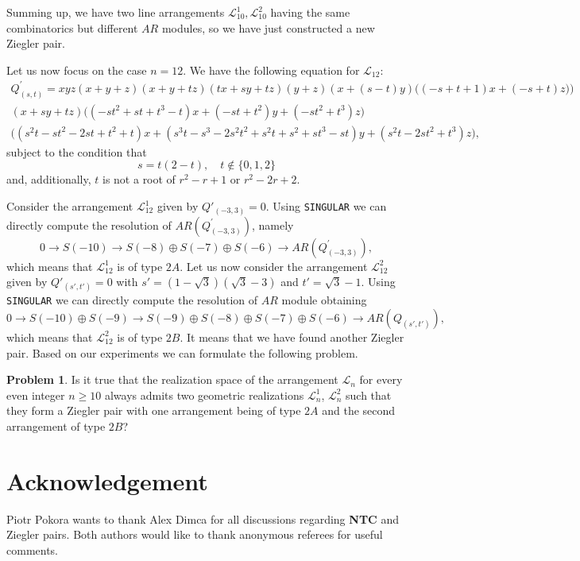 \documentclass[12pt]{article}
\theoremstyle{plain}
\theoremstyle{definition}
\newtheorem{problem}[thm]{Problem}
\renewcommand\geq{\geqslant}
\begin{document}
Summing up, we have two line arrangements $\mathcal{L}_{10}^{1}, \mathcal{L}_{10}^{2}$ having the same combinatorics but different $AR$ modules, so we have just constructed a new Ziegler pair.


Let us now focus on the case $n=12$. We have the following equation for $\mathcal{L}_{12}$:
\begin{multline*}
Q^{'}_{(s,t)} =  xyz(x+y+z)(x+y+tz)(tx+sy+tz)(y+z)(x + (s-t)y)\bigg((-s+t+1)x + (-s+t)z)\bigg) \\
(x+sy+tz)\bigg((-s t^2 + st + t^3 - t)x+(-st + t^2)y+(-st^2 + t^3)z\bigg) \\
\bigg((s^2 t - st^2 - 2st + t^2 + t)x+(s^3t - s^3 - 2s^2 t^2 + s^2 t + s^2 + s t^3 - st)y + (s^2 t - 2st^2 + t^3)z\bigg),
\end{multline*}
subject to the condition that $$ s = t(2-t), \quad t \notin \{ 0,1,2 \} $$
and, additionally, $t$ is not a root of $r^2-r+1$ or $r^2-2r+2$.

Consider the arrangement $\mathcal{L}_{12}^{1}$ given by $Q'_{(-3,3)} = 0$. Using \verb}SINGULAR} we can directly compute the resolution of $AR(Q^{'}_{(-3,3)})$, namely
\begin{equation*}
0\rightarrow S(-10) \rightarrow S(-8) \oplus S(-7) \oplus S(-6) \rightarrow AR(Q^{'}_{(-3,3)}),
\end{equation*}
which means that $\mathcal{L}_{12}^{1}$ is of type $2A$. 
\noindent
Let us now consider the arrangement $\mathcal{L}_{12}^{2}$ given by $Q'_{(s',t')} = 0$ with $s'=(1 - \sqrt3 ) (\sqrt3 - 3)$ and $t'=\sqrt{3}-1$. Using \verb}SINGULAR} we can directly compute the resolution of $AR$ module obtaining 
\begin{equation*}
0\rightarrow S(-10) \oplus S(-9) \rightarrow S(-9) \oplus S(-8) \oplus S(-7) \oplus S(-6) \rightarrow AR(Q_{(s',t')}),
\end{equation*}
which means that $\mathcal{L}_{12}^{2}$ is of type $2B$. It means that we have found another Ziegler pair. Based on our experiments we can formulate the following problem.
\begin{problem}
Is it true that the realization space of the arrangement $\mathcal{L}_{n}$ for every even integer $n\geq 10$ always admits two geometric realizations $\mathcal{L}_{n}^{1}$, $\mathcal{L}_{n}^{2}$ such that they form a Ziegler pair with one arrangement being of type $2A$ and the second arrangement of type $2B$? 
\end{problem}
\section*{Acknowledgement}
Piotr Pokora wants to thank Alex Dimca for all discussions regarding \textbf{NTC} and Ziegler pairs. Both authors would like to thank anonymous referees for useful comments.
\end{document}

